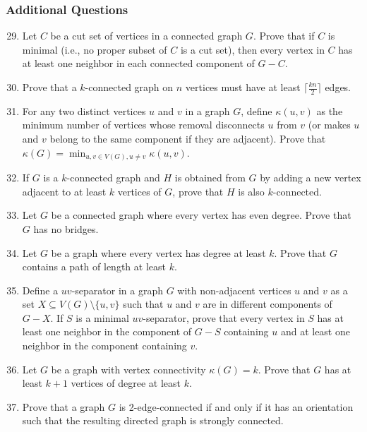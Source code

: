 \documentclass{article}
\theoremstyle{definition}
\begin{document}
\subsubsection{Additional Questions}
\begin{enumerate}\setcounter{enumi}{28}
\item Let $C$ be a cut set of vertices in a connected graph $G$. Prove that if $C$ is minimal (i.e., no proper subset of $C$ is a cut set), then every vertex in $C$ has at least one neighbor in each connected component of $G - C$.

\item Prove that a $k$-connected graph on $n$ vertices must have at least $\lceil \frac{kn}{2} \rceil$ edges.

\item For any two distinct vertices $u$ and $v$ in a graph $G$, define $\kappa(u,v)$ as the minimum number of vertices whose removal disconnects $u$ from $v$ (or makes $u$ and $v$ belong to the same component if they are adjacent). Prove that $\kappa(G) = \min_{u,v \in V(G), u \neq v} \kappa(u,v)$.

\item If $G$ is a $k$-connected graph and $H$ is obtained from $G$ by adding a new vertex adjacent to at least $k$ vertices of $G$, prove that $H$ is also $k$-connected.

\item Let $G$ be a connected graph where every vertex has even degree. Prove that $G$ has no bridges.

\item Let $G$ be a graph where every vertex has degree at least $k$. Prove that $G$ contains a path of length at least $k$.

\item Define a $uv$-separator in a graph $G$ with non-adjacent vertices $u$ and $v$ as a set $X \subseteq V(G) \setminus \{u,v\}$ such that $u$ and $v$ are in different components of $G - X$. If $S$ is a minimal $uv$-separator, prove that every vertex in $S$ has at least one neighbor in the component of $G - S$ containing $u$ and at least one neighbor in the component containing $v$.

\item Let $G$ be a graph with vertex connectivity $\kappa(G) = k$. Prove that $G$ has at least $k+1$ vertices of degree at least $k$.

\item Prove that a graph $G$ is 2-edge-connected if and only if it has an orientation such that the resulting directed graph is strongly connected.


\end{enumerate}
\end{document}
